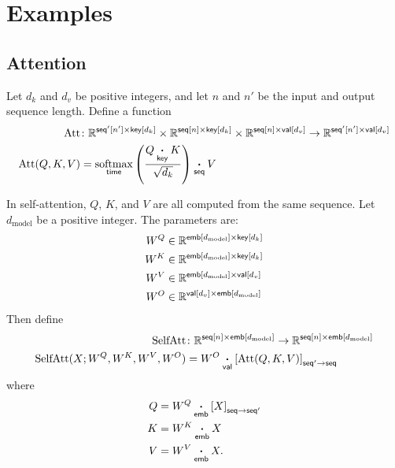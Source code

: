 \documentclass{article}
\newcommand{\dmodel}{d_{\text{model}}}
\begin{document}
\section{Examples}
\label{sec:examples}

\subsection{Attention}

Let $d_k$ and $d_v$ be positive integers, and let $n$ and $n'$ be the input and output sequence length. Define a function
\begin{align*}
  \text{Att} &\colon \mathbb{R}^{\nset{seq'}{n'} \times\nset{key}{d_k}} \times \mathbb{R}^{\nset{seq}{n} \times\nset{key}{d_k}} \times \mathbb{R}^{\nset{seq}{n} \times\nset{val}{d_v}} \rightarrow \mathbb{R}^{\nset{seq'}{n'} \times\nset{val}{d_v}} \\
  \text{Att}(Q,K,V) &= \nfun{time}{softmax} \left( \frac{Q \ndot{key} K}{\sqrt{d_k}} \right) \ndot{seq} V
\end{align*}

In self-attention, $Q$, $K$, and $V$ are all computed from the same sequence.  Let $\dmodel$ be a positive integer. The parameters are:
\begin{align*}
  W^Q &\in \mathbb{R}^{\nset{emb}{\dmodel} \times \nset{key}{d_k}} \\
  W^K &\in \mathbb{R}^{\nset{emb}{\dmodel} \times \nset{key}{d_k}} \\
  W^V &\in \mathbb{R}^{\nset{emb}{\dmodel} \times \nset{val}{d_v}} \\
  W^O &\in \mathbb{R}^{\nset{val}{d_v} \times \nset{emb}{\dmodel}}
\end{align*}
Then define
\begin{align*}
  \text{SelfAtt} &\colon \mathbb{R}^{\nset{seq}{n} \times\nset{emb}{\dmodel}} \rightarrow \mathbb{R}^{\nset{seq}{n} \times\nset{emb}{\dmodel}} \\
  \text{SelfAtt}(X; W^Q, W^K, W^V, W^O) &= W^O \ndot{val} \nmov{seq'}{seq}{\text{Att}(Q, K, V)}
\end{align*}
where
\begin{align*}
  Q &= W^Q \ndot{emb} \nmov{seq}{seq'}{X} \\
  K &= W^K \ndot{emb} X \\
  V &= W^V \ndot{emb} X.
\end{align*}
\end{document}
